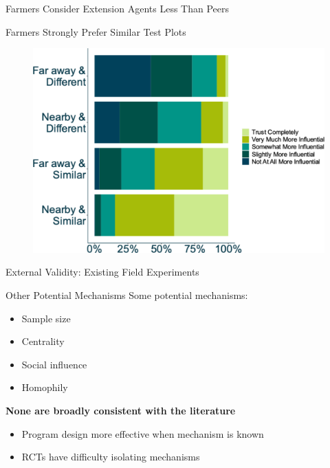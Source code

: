 \documentclass[
  ignorenonframetext,
]{beamer}
\providecommand{\tightlist}{%
  \setlength{\itemsep}{0pt}\setlength{\parskip}{0pt}}\usepackage{longtable,booktabs,array}
\begin{document}
\begin{frame}{Farmers Consider Extension Agents Less Than Peers}
\begin{frame}{Farmers Strongly Prefer Similar Test Plots}
\begin{figure}
{\centering \includegraphics{presentation2_files/figure-beamer/unnamed-chunk-8-1.svg}

}

\end{figure}
\end{frame}
\end{frame}

\begin{frame}{External Validity: Existing Field Experiments}
\protect\hypertarget{external-validity-existing-field-experiments}{}
\end{frame}

\begin{frame}{Other Potential Mechanisms}
\protect\hypertarget{other-potential-mechanisms}{}
Some potential mechanisms:

\begin{itemize}[<+->]
\tightlist
\item
  Sample size
\item
  Centrality
\item
  Social influence
\item
  Homophily
\end{itemize}

\textbf{None are broadly consistent with the literature}

\begin{itemize}[<+->]
\tightlist
\item
  Program design more effective when mechanism is known
\item
  RCTs have difficulty isolating mechanisms
\end{itemize}
\end{frame}
\end{document}
